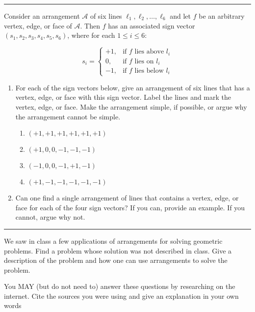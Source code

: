 \documentclass[11pt]{article}
\newcommand{\A}{{\mathcal{A}}}
\begin{document}
\hrule











Consider an arrangement $\A$ of six lines $\ell_1, \ell_2, \ldots, \ell_6$ and
let $f$ be an arbitrary vertex, edge, or face of $\A$. Then $f$ has an
associated sign vector $(s_1, s_2, s_3, s_4, s_5, s_6)$, where for each $1 \le i
\le 6$:

$$
    s_i =
    \begin{cases}
        +1, & \text{if $f$ lies above $l_i$} \\
        0,  & \text{if $f$ lies on $l_i$} \\
        -1, & \text{if $f$ lies below $l_i$}
    \end{cases}
$$

\begin{enumerate}

    \item For each of the sign vectors below, give an arrangement of six lines
        that has a vertex, edge, or face with this sign vector. Label the lines
        and mark the vertex, edge, or face. Make the arrangement simple, if
        possible, or argue why the arrangement cannot be simple.
        \begin{enumerate}
            \item $(+1, +1, +1, +1, +1, +1)$
            \item $(+1, 0, 0, -1, -1, -1)$
            \item $(-1, 0, 0, -1, +1, -1)$
            \item $(+1, -1, -1, -1, -1, -1)$
        \end{enumerate}

    \item Can one find a single arrangement of lines that contains a vertex,
        edge, or face for each of the four sign vectors? If you can, provide an
        example.  If you cannot, argue why not.

\end{enumerate}

\hrule












We saw in class a few applications of arrangements for solving geometric
problems. Find a problem whose solution was not described in class.  Give a
description of the problem and how one can use arrangements to solve the
problem.

You MAY (but do not need to) answer these questions by researching on the
internet. Cite the sources you were using and give an explanation in your own
words
\end{document}
